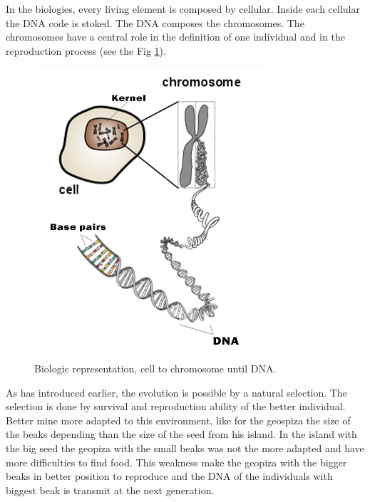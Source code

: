 In the biologies, every living element is composed by cellular. Inside each cellular  the DNA code is stoked. The DNA composes the chromosomes. The chromosomes have a central role in the definition of one individual and in the reproduction process (see the Fig \ref{fig:celTokrom}). \\
\begin{figure}[t!]
\center
{}
   \includegraphics[width=\linewidth]{img/celTokromEN.png}
  \caption{ Biologic representation, cell to chromosome until DNA.}\label{fig:celTokrom}
  \endminipage\hfill
\end{figure}
As has introduced earlier, the evolution is possible by a natural selection. The selection is done by survival and reproduction ability of the better individual. Better mine more adapted to this environment, like for the geospiza the size of the beaks depending than the size of the seed from his island.
In the island with the big seed  the geopiza with the small beaks was not the more adapted and have more difficulties to find food. This weakness make the geopiza with the bigger beaks in better position to reproduce and the DNA of the individuals with biggest beak is transmit at the next generation.\\
